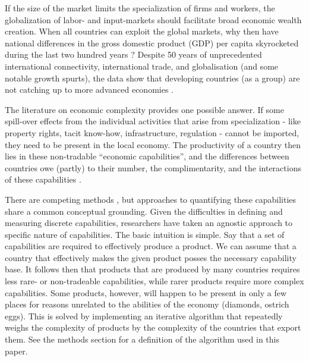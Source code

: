 \documentclass[11pt]{article}
\begin{document}
If the size of the market limits the specialization of firms and workers, the globalization of labor- and input-markets should facilitate broad economic wealth creation. When all countries can exploit the global markets, why then have national differences in the gross domestic product (GDP) per capita skyrocketed during the last two hundred years \citep{pritchett_divergence_1997}? Despite 50 years of unprecedented international connectivity, international trade, and globalisation (and some notable growth spurts), the data show that developing countries (as a group) are not catching up to more advanced economies \citep{johnson_what_2020}.

The literature on economic complexity provides one possible answer. If some spill-over effects from the individual activities that arise from  specialization - like property rights, tacit know-how, infrastructure, regulation - cannot be imported, they need to be present in the local economy. The productivity of a country then lies in these non-tradable ``economic capabilities'', and the differences between countries owe (partly) to their number, the complimentarity, and the interactions of these capabilities \citep{hidalgo_product_2007,hausmann_atlas_2013}.

There are competing methods \citep{tacchella_new_2012,hidalgo_building_2009,inoua_simple_2016}, but approaches to quantifying these capabilities share a common conceptual grounding. Given the difficulties in defining and measuring discrete capabilities, researchers have taken an agnostic approach to specific nature of capabilities. The basic intuition is simple. Say that a set of capabilities are required to effectively produce a product. We can assume that a country that effectively makes the given product posses the necessary capability base. It follows then that products that are produced by many countries requires less rare- or non-tradeable capabilities, while rarer products require more complex capabilities. Some products, however, will happen to be present in only a few places for reasons unrelated to the abilities of the economy (diamonds, ostrich eggs). This is solved by implementing an iterative algorithm that repeatedly weighs the complexity of products by the complexity of the countries that export them. See the methods section for a definition of the algorithm used in this paper.
\end{document}
